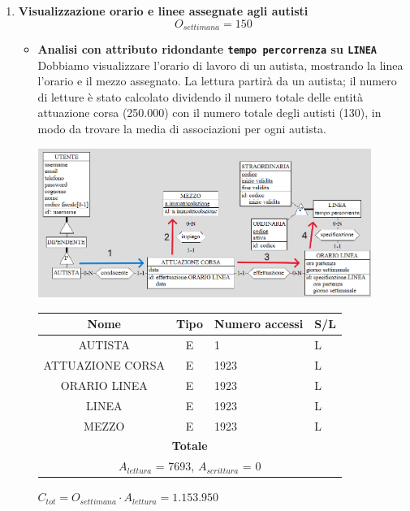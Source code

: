 \documentclass[12pt,a4paper]{report}
\begin{document}
\begin{enumerate}[label=\textbf{\arabic*}]
         \item \textbf{Visualizzazione orario e linee assegnate agli autisti} \label{op4} \\
            \[ {O_{settimana} = 150} \]
           \begin{itemize}
            \item \textbf{Analisi con attributo ridondante \texttt{tempo percorrenza} su \texttt{LINEA}} \\
            Dobbiamo visualizzare l'orario di lavoro di un autista, mostrando la linea l'orario e il mezzo assegnato.
            La lettura partirà da un autista; il numero di letture è stato calcolato dividendo il numero totale delle entità attuazione corsa (250.000) con il numero totale degli autisti (130), in modo da trovare la media di associazioni per ogni autista.
            \begin{center}
	        \includegraphics[width=0.9\textwidth]{op_4_RID}
	        \end{center}
            \begin{table}[H]
            \centering
            \begin{tabular}{|c|c|l|l|}
            \hline
            \textbf{Nome} & \textbf{Tipo} & \textbf{Numero accessi} & \textbf{S/L} \\
            \hline
            AUTISTA & E & 1 & L \\
            \hline
            ATTUAZIONE CORSA & E & 1923 & L \\
            \hline
            ORARIO LINEA & E & 1923 & L \\
            \hline
            LINEA & E & 1923 & L \\
            \hline
            MEZZO & E & 1923 & L \\
            \hline
            \multicolumn{4}{c}{\textbf{Totale}} \\
            \multicolumn{4}{c}{${A_{lettura}}$ = 7693, ${A_{scrittura}}$ = 0} \\
            \hline
            \end{tabular}
            \end{table}
            \begin{center}
            ${C_{tot} = {O_{settimana}}\cdot {A_{lettura}} =1.153.950}$
            \end{center}


\end{itemize}
\end{enumerate}
\end{document}
